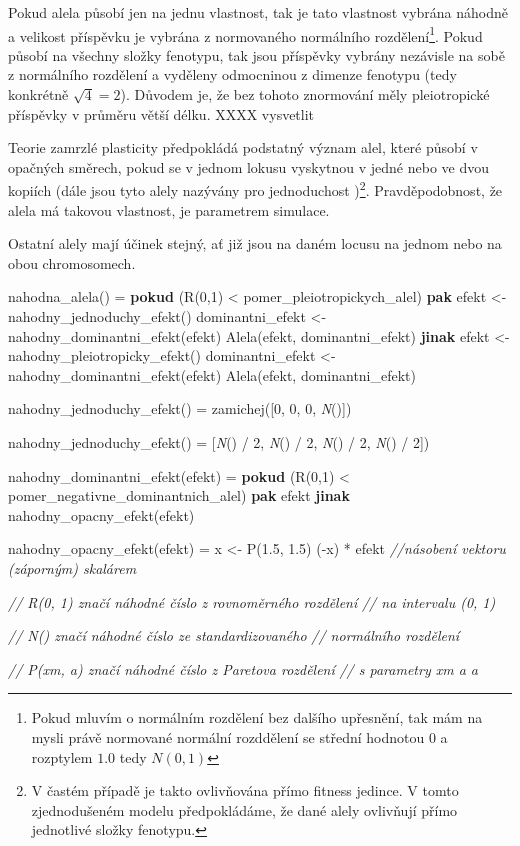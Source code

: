 Pokud alela působí jen na jednu vlastnost, tak je tato vlastnost vybrána náhodně a velikost příspěvku je vybrána z
normovaného normálního rozdělení\footnote{Pokud mluvím o normálním rozdělení bez dalšího upřesnění, tak mám na mysli
právě normované normální rozddělení se střední hodnotou $0$ a rozptylem $1.0$ tedy $N(0, 1)$}.
Pokud působí na všechny složky fenotypu, tak jsou příspěvky vybrány nezávisle na sobě z normálního
rozdělení a vyděleny odmocninou z dimenze fenotypu (tedy konkrétně $\sqrt{4} = 2$).
Důvodem je, že bez tohoto znormování měly pleiotropické příspěvky v průměru větší délku. XXXX vysvetlit

Teorie zamrzlé plasticity předpokládá podstatný význam alel, které působí v opačných směrech, pokud se
v jednom lokusu vyskytnou v jedné nebo ve dvou kopiích (dále jsou tyto alely nazývány pro jednoduchost
)\footnote{
V častém případě je takto ovlivňována přímo fitness jedince. V tomto zjednodušeném modelu předpokládáme, že dané alely
ovlivňují přímo jednotlivé složky fenotypu.
}. Pravděpodobnost, že alela má takovou vlastnost, je parametrem simulace.

Ostatní alely mají účinek stejný, ať již jsou na daném locusu na jednom nebo na obou chromosomech.

\begin{tcolorbox}[ title={Pseudokód popisující generování náhodné alely}
                 , breakable
                 ]

\begin{code}[commandchars=\\\{\}]
nahodna_alela() =
    \textbf{pokud} (R(0,1) < pomer_pleiotropickych_alel)
        \textbf{pak}
            efekt <- nahodny_jednoduchy_efekt()
            dominantni_efekt <- nahodny_dominantni_efekt(efekt)
            Alela(efekt, dominantni_efekt)
        \textbf{jinak}
            efekt <- nahodny_pleiotropicky_efekt()
            dominantni_efekt <- nahodny_dominantni_efekt(efekt)
            Alela(efekt, dominantni_efekt)

nahodny_jednoduchy_efekt() =
    zamichej([0, 0, 0, \textit{N}()])

nahodny_jednoduchy_efekt() =
    [\textit{N}() / 2, \textit{N}() / 2, \textit{N}() / 2, \textit{N}() / 2])

nahodny_dominantni_efekt(efekt) =
    \textbf{pokud} (R(0,1) < pomer_negativne_dominantnich_alel)
        \textbf{pak} efekt
        \textbf{jinak} nahodny_opacny_efekt(efekt)

nahodny_opacny_efekt(efekt) =
    x <- P(1.5, 1.5)
    (-x) * efekt \textit{//násobení vektoru (záporným) skalárem}

\textit{// {R}(0, 1) značí náhodné číslo z rovnoměrného rozdělení}
\textit{//           na intervalu (0, 1)}

\textit{// {N}() značí náhodné číslo ze standardizovaného}
\textit{//       normálního rozdělení}

\textit{// {P}(xm, a) značí náhodné číslo z Paretova rozdělení}
\textit{//            s parametry xm a a}
\end{code}
\end{tcolorbox}

